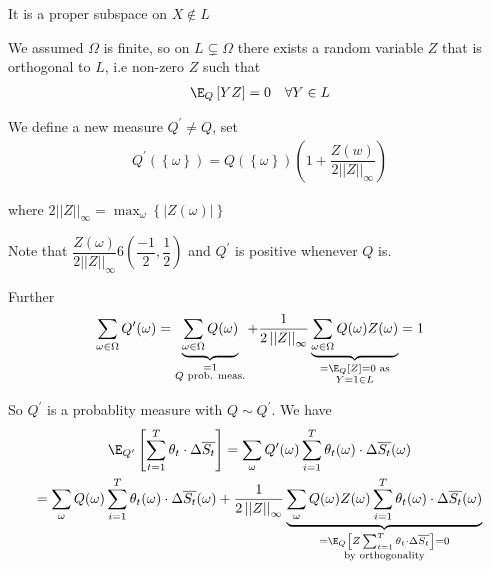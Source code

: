 \begin{prf}{}
  \noindent It is a proper subspace on $X\not\in L$\par
  \noindent We assumed $\Omega$ is finite, so on $L\subsetneq \Omega$ there exists a random variable $Z$ that is orthogonal to $L$, i.e non-zero $Z$ such that
  \begin{equation*}
    \begin{gathered}
      \E_Q\left[YZ\right] = 0\quad\forall Y\in L
    \end{gathered}
  \end{equation*}
  \par\bigskip
  \noindent We define a new measure $Q^{\prime}\neq Q$, set
  \begin{equation*}
    \begin{gathered}
      Q^{\prime}(\left\{\omega\right\}) = Q(\left\{\omega\right\})\left(1+\dfrac{Z(w)}{2\left|\left|Z\right|\right|_\infty}\right)
    \end{gathered}
  \end{equation*}\par
\noindent where $2\left|\left|Z\right|\right|_\infty =\max_\omega\left\{\left|Z(\omega)\right|\right\}$
\par\bigskip
\noindent Note that $\dfrac{Z(\omega)}{2\left|\left|Z\right|\right|_\infty}6\left(\dfrac{-1}{2},\dfrac{1}{2}\right)$ and $Q^{\prime}$ is positive whenever $Q$ is.\par
\noindent Further
\begin{equation*}
  \begin{gathered}
    \sum_{\omega\in\Omega}Q^{\prime}(\omega) = \underbrace{\sum_{\omega\in\Omega}Q(\omega)}_{\substack{=1\\\text{$Q$ prob. meas.}}}+\dfrac{1}{2\left|\left|Z\right|\right|_\infty}\underbrace{\sum_{\omega\in\Omega}Q(\omega)Z(\omega)}_{\substack{=\E_Q\left[Z\right]=0\text{ as}\\Y=1\in L}} = 1
  \end{gathered}
\end{equation*}
\par\bigskip
\noindent So $Q^{\prime}$ is a probablity measure with $Q\sim Q^{\prime}$. We have
\begin{equation*}
  \begin{gathered}
    \E_{Q^{\prime}}\left[\sum_{t=1}^{T}\theta_t\cdot\Delta\overline{S_t}\right] = \sum_\omega Q^{\prime}(\omega)\sum_{i=1}^{T}\theta_t(\omega)\cdot\Delta\overline{S_t}(\omega)\\
    =\sum_\omega Q(\omega)\sum_{i=1}^{T}\theta_t(\omega)\cdot\Delta\overline{S_t}(\omega) + \dfrac{1}{2\left|\left|Z\right|\right|_\infty}\underbrace{\sum_\omega Q(\omega)Z(\omega)\sum_{i=1}^{T}\theta_t(\omega)\cdot\Delta\overline{S_t}(\omega)}_{\substack{=\E_Q\left[Z\sum_{t=1}^{T}\theta_t\cdot\Delta\overline{S_t}\right]=0\\\text{by orthogonality}}}\\

\end{gathered}
\end{equation*}
\end{prf}
